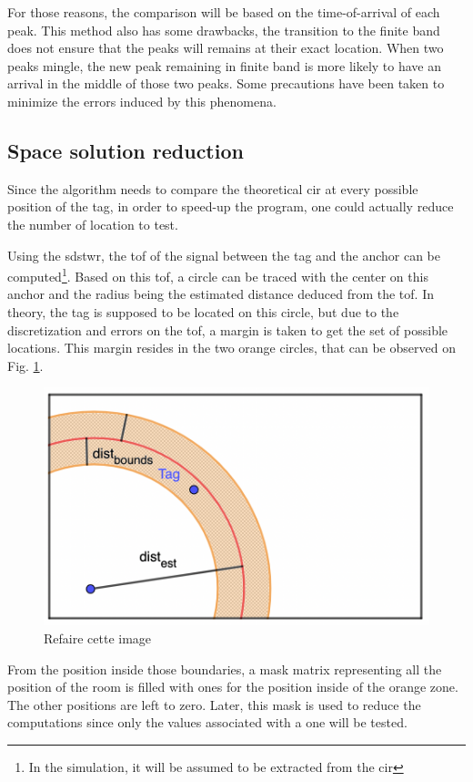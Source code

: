 For those reasons, the comparison will be based on the time-of-arrival of each peak. This method also has some drawbacks, the transition to the finite band does not ensure that the peaks will remains at their exact location. When two peaks mingle, the new peak remaining in finite band is more likely to have an arrival in the middle of those two peaks. Some precautions have been taken to minimize the errors induced by this phenomena.
\vspace{2mm}

\subsection{Space solution reduction}

Since the algorithm needs to compare the theoretical \gls{cir} at every possible position of the tag, in order to speed-up the program, one could actually reduce the number of location to test.
\vspace{2mm}

Using the \gls{sdstwr}, the \gls{tof} of the signal between the tag and the anchor can be computed\footnote{In the simulation, it will be assumed to be extracted from the \gls{cir}}. Based on this \gls{tof}, a circle can be traced with the center on this anchor and the radius being the estimated distance deduced from the \gls{tof}. In theory, the tag is supposed to be located on this circle, but due to the discretization and errors on the \gls{tof}, a margin is taken to get the set of possible locations. This margin resides in the two orange circles, that can be observed on Fig. \ref{fig:speedup_1}.
\vspace{2mm}

\begin{figure}[H]
\centering
\includegraphics[width=.65\linewidth]{Images/algo_1.png}
\caption{\color{red} Refaire cette image \color{black}}
\label{fig:speedup_1}
\end{figure}

From the position inside those boundaries, a mask matrix representing all the position of the room is filled with ones for the position inside of the orange zone. The other positions are left to zero. Later, this mask is used to reduce the computations since only the values associated with a one will be tested.

